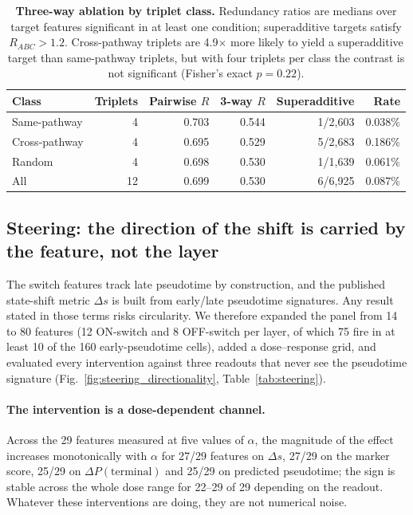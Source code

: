 \documentclass[11pt,onecolumn]{article}
\begin{document}
\begin{table}[t!]
\centering
\caption{{\bf Three-way ablation by triplet class.} Redundancy ratios are medians over target features significant in at least one condition; superadditive targets satisfy $R_{ABC}>1.2$. Cross-pathway triplets are 4.9$\times$ more likely to yield a superadditive target than same-pathway triplets, but with four triplets per class the contrast is not significant (Fisher's exact $p=0.22$).}
\label{tab:threeway}
\small
\begin{tabular}{lrrrrr}
\toprule
Class & Triplets & Pairwise $R$ & 3-way $R$ & Superadditive & Rate \\
\midrule
Same-pathway & 4 & 0.703 & 0.544 & 1/2{,}603 & 0.038\% \\
Cross-pathway & 4 & 0.695 & 0.529 & 5/2{,}683 & 0.186\% \\
Random & 4 & 0.698 & 0.530 & 1/1{,}639 & 0.061\% \\
\midrule
All & 12 & 0.699 & 0.530 & 6/6{,}925 & 0.087\% \\
\bottomrule
\end{tabular}
\end{table}

\subsection{Steering: the direction of the shift is carried by the feature, not the layer}

The switch features track late pseudotime by construction, and the published state-shift metric $\Delta s$ is built from early/late pseudotime signatures. Any result stated in those terms risks circularity. We therefore expanded the panel from 14 to 80 features (12 ON-switch and 8 OFF-switch per layer, of which 75 fire in at least 10 of the 160 early-pseudotime cells), added a dose--response grid, and evaluated every intervention against three readouts that never see the pseudotime signature (Fig.~\ref{fig:steering_directionality}, Table~\ref{tab:steering}).

\paragraph{The intervention is a dose-dependent channel.}
Across the 29 features measured at five values of $\alpha$, the magnitude of the effect increases monotonically with $\alpha$ for 27/29 features on $\Delta s$, 27/29 on the marker score, 25/29 on $\Delta P(\text{terminal})$ and 25/29 on predicted pseudotime; the sign is stable across the whole dose range for 22--29 of 29 depending on the readout. Whatever these interventions are doing, they are not numerical noise.
\end{document}
